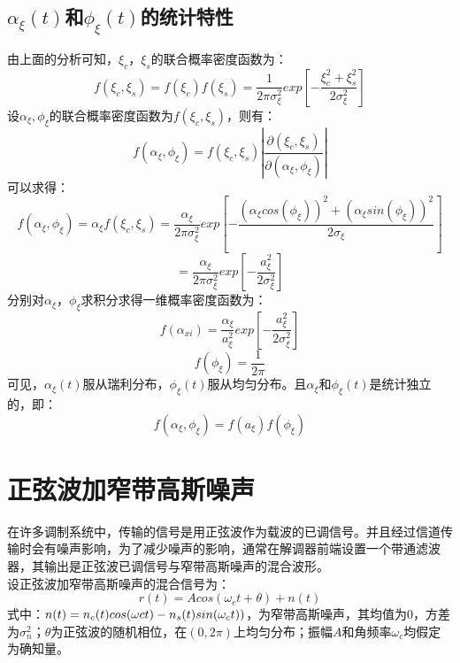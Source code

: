 \documentclass[12pt,a4paper,oneside]{ctexart}
\begin{document}
\subsection{$ \alpha_{\xi}(t)$和$ \phi_{\xi}(t)$的统计特性}
由上面的分析可知，$\xi_{c}$，$\xi_{s}$的联合概率密度函数为：
$$
    f(\xi_{c},\xi_{s}) = f(\xi_{c})f(\xi_{s}) = \frac{1}{2\pi\sigma^{2}_{\xi}}exp\left[-\frac{\xi^{2}_{c} + \xi^{2}_{s}}{2\sigma^{2}_{\xi}}\right]
$$
设$\alpha_{\xi},\phi_{\xi}$的联合概率密度函数为$f(\xi_{c},\xi_{s})$，则有：
$$
    f(\alpha_{\xi},\phi_{\xi}) = f(\xi_{c},\xi_{s})|\frac{\partial(\xi_{c},\xi_{s})}{\partial(\alpha_{\xi},\phi_{\xi})}|
$$
可以求得：
$$
    f(\alpha_{\xi},\phi_{\xi}) = \alpha_{\xi}f(\xi_{c},\xi_{s}) = \frac{\alpha_{\xi}}{2\pi\sigma^{2}_{\xi}}exp\left[-\frac{(\alpha_{\xi}cos(\phi_{\xi}))^{2} + (\alpha_{\xi}sin(\phi_{\xi}))^{2}}{2\sigma_{\xi}}\right]
$$
$$
     = \frac{\alpha_{\xi}}{2\pi\sigma^{2}_{\xi}}exp\left[-\frac{a^{2}_{\xi}}{2\sigma^{2}_{\xi}}\right]
$$
分别对$\alpha_{\xi}$，$\phi_{\xi}$求积分求得一维概率密度函数为：
$$
    f(\alpha_{xi}) = \frac{\alpha_{\xi}}{a^{2}_{\xi}}exp\left[-\frac{a^{2}_{\xi}}{2\sigma^{2}_{\xi}}\right]
$$
$$
    f(\phi_{\xi}) = \frac{1}{2\pi}
$$
可见，$\alpha_{\xi}(t)$服从瑞利分布，$\phi_{\xi}(t)$服从均匀分布。且$\alpha_{\xi}$和$\phi_{\xi}(t)$是统计独立的，即：
$$
    f(\alpha_{\xi},\phi_{\xi}) = f(a_{\xi})f(\phi_{\xi})
$$
\section{正弦波加窄带高斯噪声}
在许多调制系统中，传输的信号是用正弦波作为载波的已调信号。并且经过信道传输时会有噪声影响，为了减少噪声的影响，通常在解调器前端设置一个带通滤波器，其输出是正弦波已调信号与窄带高斯噪声的混合波形。\\
设正弦波加窄带高斯噪声的混合信号为：
$$
    r(t) = Acos(\omega_{c}t + \theta ) + n(t)
$$
式中：$n(t) = n_{c}(t)cos(\omega\-{c}t) - n_{s}(t)sin(\omega_{c}t))$，为窄带高斯噪声，其均值为0，方差为$\sigma^{2}_{n}$；$\theta$为正弦波的随机相位，在$(0,2\pi)$上均匀分布；振幅$A$和角频率$\omega_{c}$均假定为确知量。
\end{document}
